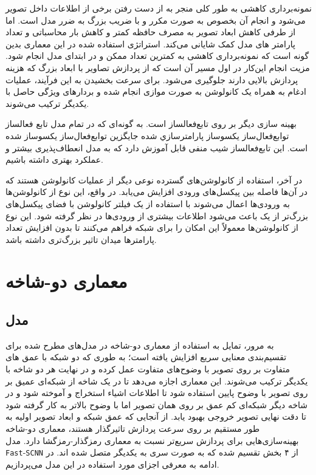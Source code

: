 نمونه‌برداری کاهشی
به طور کلی منجر به از دست رفتن برخی از اطلاعات داخل تصویر می‌شود و انجام آن بخصوص به صورت مکرر و با ضریب بزرگ به ضرر مدل است. اما از طرفی کاهش ابعاد تصویر به مصرف حافظه کمتر و کاهش بار محاسباتی و تعداد پارامتر های مدل کمک شایانی می‌کند. استراتژی استفاده شده در این معماری بدین گونه است که نمونه‌برداری کاهشی به کمترین تعداد ممکن و در ابتدای مدل انجام شود. مزیت انجام این‌کار در اول مسیر آن است که از پردازش تصاویر با ابعاد بزرگ که هزینه پردازش بالایی دارند جلوگیری می‌شود. برای سرعت بخشیدن به این فرآیند، عملیات ادغام به همراه یک کانولوشن به صورت موازی انجام شده و بردار‌های ویژگی حاصل با یکدیگر ترکیب می‌شوند.

بهینه سازی دیگر بر روی تابع‌فعالساز است. به گونه‌ای که در تمام مدل تابع فعالساز توابع‌فعال‌ساز یکسوساز پارامترسازي شده
جایگزین توابع‌فعال‌ساز یکسوساز شده است. این تابع‌فعالساز شیب منفی قابل آموزش دارد که به مدل انعطاف‌پذیری بیشتر و عملکرد بهتری داشته باشیم.

در آخر، استفاده از کانولوشن‌های گسترده
نوعی دیگر از عملیات کانولوشن هستند که در آن‌ها فاصله‌ بین پیکسل‌های ورودی افزایش می‌یابد. در واقع، این نوع از کانولوشن‌ها به ورودی‌ها اعمال می‌شوند با استفاده از یک فیلتر کانولوشن با فضای پیکسل‌های بزرگ‌تر از یک باعث می‌شود اطلاعات بیشتری از ورودی‌ها در نظر گرفته شود. این نوع از کانولوشن‌ها معمولاً این امکان را برای شبکه فراهم می‌کنند تا بدون افزایش تعداد پارامترها میدان تاثیر بزرگ‌تری داشته باشد.

\section{معماری دو-شاخه}

\subsection{مدل }

به مرور، تمایل به استفاده از معماری دو-شاخه
در مدل‌های مطرح شده برای تقسیم‌بندی معنایی سریع افزایش یافته است؛ به طوری که دو شبکه با عمق های متفاوت بر روی تصویر با وضوح‌های متفاوت عمل کرده و در نهایت هر دو شاخه با یکدیگر ترکیب می‌شوند. این معماری اجازه می‌دهد تا در یک شاخه از شبکه‌ای عمیق
بر روی تصویر با وضوح پایین استفاده شود تا اطلاعات اشیاء استخراج و آموخته شود و در شاخه دیگر شبکه‌ای کم عمق
بر روی همان تصویر اما با وضوح بالاتر به کار گرفته شود تا دقت نهایی تصویر خروجی بهبود یابد. از آنجایی که عمق شبکه و ابعاد تصویر اولیه به طور مستقیم بر روی سرعت پردازش تاثیرگذار هستند، معماری دو-شاخه بهینه‌سازی‌هایی برای پردازش سریع‌تر نسبت به معماری رمزگذار-رمزگشا دارد. مدل
\verb*|Fast|-\verb*|SCNN|
از ۴ بخش تقسیم شده که به صورت سری به یکدیگر متصل شده اند. در ادامه به معرفی اجزای مورد استفاده در این مدل می‌پردازیم.


